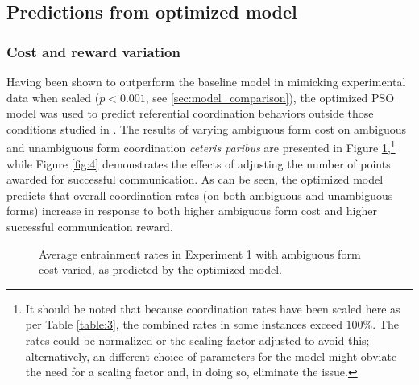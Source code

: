 \documentclass[11pt]{article}
\begin{document}
\subsection{Predictions from optimized model}
\subsubsection{Cost and reward variation}
Having been shown to outperform the baseline model in mimicking experimental data when scaled ($p<0.001$, see \ref{sec:model_comparison}), the optimized PSO model was used to predict referential coordination behaviors outside those conditions studied in \citeauthor{rohde2012}. The results of varying ambiguous form cost on ambiguous and unambiguous form coordination \textit{ceteris paribus} are presented in Figure \ref{fig:3},\footnote{It should be noted that because coordination rates have been scaled here as per Table \ref{table:3}, the combined rates in some instances exceed $100\%$. The rates could be normalized or the scaling factor adjusted to avoid this; alternatively, an different choice of parameters for the model might obviate the need for a scaling factor and, in doing so, eliminate the issue.} while Figure \ref{fig:4} demonstrates the effects of adjusting the number of points awarded for successful communication. As can be seen, the optimized model predicts that overall coordination rates (on both ambiguous and unambiguous forms) increase in response to both higher ambiguous form cost and higher successful communication reward.

\begin{figure}
\centering
\scalebox{.475}{}
\caption{Average entrainment rates in Experiment 1 with ambiguous form cost varied, as predicted by the optimized model.}
\label{fig:3}
\end{figure}

\end{document}

